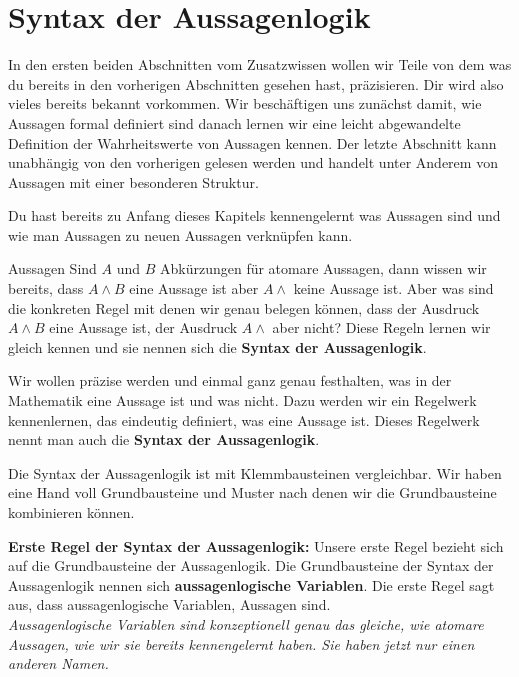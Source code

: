 \documentclass[../../main.tex]{subfiles}
\begin{document}
    \section*{Syntax der Aussagenlogik}
    In den ersten beiden Abschnitten vom Zusatzwissen wollen wir Teile von 
    dem was du bereits in den vorherigen Abschnitten gesehen hast, präzisieren.
    Dir wird also vieles bereits bekannt vorkommen. Wir beschäftigen uns zunächst 
    damit, wie Aussagen formal definiert sind danach lernen wir eine 
    leicht abgewandelte Definition der Wahrheitswerte von Aussagen kennen. 
    Der letzte Abschnitt kann unabhängig
    von den vorherigen gelesen werden und handelt unter Anderem von Aussagen mit einer besonderen Struktur.


    Du hast bereits zu Anfang dieses Kapitels kennengelernt was Aussagen sind und wie man Aussagen zu neuen
    Aussagen verknüpfen kann. 

    \begin{example}{Aussagen}
        Sind $A$ und $B$ Abkürzungen für atomare Aussagen, dann wissen wir bereits,
        dass $A \land B$ eine Aussage ist aber $A \land $ keine Aussage ist.
        Aber was sind die konkreten Regel mit denen wir genau belegen
        können, dass der Ausdruck $A\land B$ eine Aussage ist,
        der Ausdruck $A \land $ aber nicht? 
        Diese Regeln lernen wir gleich kennen und sie nennen sich 
        die \textbf{Syntax der Aussagenlogik}.
    \end{example}

    Wir wollen präzise werden und einmal ganz
    genau festhalten, was in der Mathematik eine Aussage ist und was nicht.
    Dazu werden wir ein Regelwerk kennenlernen, das eindeutig
    definiert, was eine Aussage ist. Dieses Regelwerk nennt man auch die \textbf{Syntax der
    Aussagenlogik}.

    Die Syntax der Aussagenlogik ist mit Klemmbausteinen vergleichbar. Wir haben 
    eine Hand voll Grundbausteine und Muster nach denen wir die Grundbausteine
    kombinieren können. 

    \textbf{Erste Regel der Syntax der Aussagenlogik:}
    Unsere erste Regel bezieht sich auf die Grundbausteine der Aussagenlogik. Die Grundbausteine
    der Syntax der Aussagenlogik nennen sich \textbf{aussagenlogische Variablen}.
    Die erste Regel sagt aus, dass aussagenlogische Variablen, Aussagen sind.
    \\ \textit{Aussagenlogische Variablen sind konzeptionell genau das gleiche, wie atomare Aussagen,
    wie wir sie bereits kennengelernt haben. Sie haben jetzt nur einen anderen Namen.}
\end{document}
